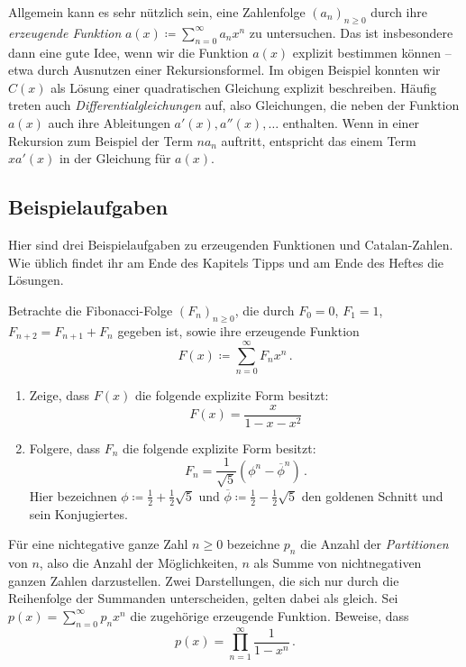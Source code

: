 Allgemein kann es sehr nützlich sein, eine Zahlenfolge $(a_n)_{n\geqslant 0}$ durch ihre \emph{erzeugende Funktion} $a(x)\coloneqq \sum_{n=0}^\infty a_nx^n$ zu untersuchen. Das ist insbesondere dann eine gute Idee, wenn wir die Funktion $a(x)$ explizit bestimmen können -- etwa durch Ausnutzen einer Rekursionsformel. Im obigen Beispiel konnten wir $C(x)$ als Lösung einer quadratischen Gleichung explizit beschreiben. Häufig treten auch \emph{Differentialgleichungen} auf, also Gleichungen, die neben der Funktion $a(x)$ auch ihre Ableitungen $a'(x),a''(x),\dotsc$ enthalten. Wenn in einer Rekursion zum Beispiel der Term $na_n$ auftritt, entspricht das einem Term $xa'(x)$ in der Gleichung für $a(x)$.


\subsection*{Beispielaufgaben}
Hier sind drei Beispielaufgaben zu erzeugenden Funktionen und Catalan-Zahlen. Wie üblich findet ihr am Ende des Kapitels Tipps und am Ende des Heftes die Lösungen.
\begin{aufgabe*}\label{aufgabe:FibonacciErzeugendeFunktion}
	Betrachte die Fibonacci-Folge $(F_n)_{n\geqslant 0}$, die durch $F_0=0$, $F_1=1$, $F_{n+2}=F_{n+1}+F_n$ gegeben ist, sowie ihre erzeugende Funktion
	\begin{equation*}
		F(x)\coloneqq\sum_{n=0}^\infty F_nx^n\,.
	\end{equation*}
	\begin{enumerate}[label={$(\alph*)$},ref={$(\alph*)$}]
		\item \label{teilaufgabe:FibonacciRekursion}Zeige, dass $F(x)$ die folgende explizite Form besitzt:
		\begin{equation*}
			F(x)=\frac{x}{1-x-x^2}
		\end{equation*}
		\item \label{teilaufgabe:FibonacciExplizit}Folgere, dass $F_n$ die folgende explizite Form besitzt:
		\begin{equation*}
			F_n=\frac{1}{\sqrt{5}}\left(\phi^n-\overline{\phi}^n\right)\,.
		\end{equation*}
		Hier bezeichnen $\phi\coloneqq \frac12+\frac12\sqrt{5}$ und $\overline{\phi}\coloneqq \frac12-\frac12\sqrt{5}$ den goldenen Schnitt und sein Konjugiertes.
	\end{enumerate}
\end{aufgabe*}
\begin{aufgabe*}\label{aufgabe:Partitionszahlen}
	Für eine nichtegative ganze Zahl $n\geqslant 0$ bezeichne $p_n$ die Anzahl der \emph{Partitionen} von $n$, also die Anzahl der Möglichkeiten, $n$ als Summe von nichtnegativen ganzen Zahlen darzustellen. Zwei Darstellungen, die sich nur durch die Reihenfolge der Summanden unterscheiden, gelten dabei als gleich. Sei $p(x)=\sum_{n=0}^\infty p_nx^n$ die zugehörige erzeugende Funktion. Beweise, dass
	\begin{equation*}
		p(x)=\prod_{n=1}^\infty\frac{1}{1-x^n}\,.
	\end{equation*}
\end{aufgabe*}
